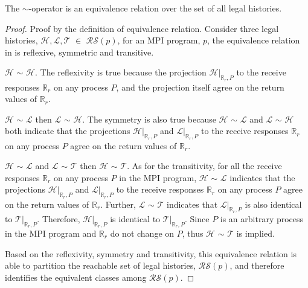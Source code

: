\begin{lemma}\label{lemma:rst}
The $\sim$-operator is an equivalence relation over the set of all legal histories.
\end{lemma}

\begin{proof}
Proof by the definition of equivalence relation. Consider three legal histories, $\mathcal{H}, \mathcal{L}, \mathcal{T}$ $\in$ $\mathcal{RS}(\mathit{p})$, for an MPI program, $\mathit{p}$, the equivalence relation in  is reflexive, symmetric and transitive.
\begin{compactenum}
\item $\mathcal{H}$ $\sim$ $\mathcal{H}$. The reflexivity is true because the projection $\mathcal{H} | _{\mathbb{R}_r,P}$ to the receive responses $\mathbb{R}_r$ on any process $P$, and the projection itself agree on the return values of $\mathbb{R}_r$.
\item $\mathcal{H}$ $\sim$ $\mathcal{L}$ then $\mathcal{L}$ $\sim$ $\mathcal{H}$. The symmetry is also true because $\mathcal{H}$ $\sim$ $\mathcal{L}$ and $\mathcal{L}$ $\sim$ $\mathcal{H}$ both indicate that the projections $\mathcal{H} | _{\mathbb{R}_r,P}$ and $\mathcal{L} | _{\mathbb{R}_r,P}$ to the receive responses $\mathbb{R}_r$ on any process $P$ agree on the return values of $\mathbb{R}_r$.
\item $\mathcal{H}$ $\sim$ $\mathcal{L}$ and $\mathcal{L}$ $\sim$ $\mathcal{T}$ then $\mathcal{H}$ $\sim$ $\mathcal{T}$. As for the transitivity, for all the receive responses $\mathbb{R}_r$ on any process $P$ in the MPI program, $\mathcal{H}$ $\sim$ $\mathcal{L}$ indicates that the projections $\mathcal{H} | _{\mathbb{R}_r,P}$ and $\mathcal{L} | _{\mathbb{R}_r,P}$ to the receive responses $\mathbb{R}_r$ on any process $P$ agree on the return values of $\mathbb{R}_r$. Further, $\mathcal{L}$ $\sim$ $\mathcal{T}$ indicates that $\mathcal{L} | _{\mathbb{R}_r,P}$ is also identical to $\mathcal{T} | _{\mathbb{R}_r,P}$. Therefore, $\mathcal{H} | _{\mathbb{R}_r,P}$ is identical to $\mathcal{T} | _{\mathbb{R}_r,P}$. Since $P$ is an arbitrary process in the MPI program and $\mathbb{R}_r$ do not change on $P$, thus $\mathcal{H}$ $\sim$ $\mathcal{T}$ is implied.
\end{compactenum}
Based on the reflexivity, symmetry and transitivity, this equivalence relation is able to partition the reachable set of legal histories, $\mathcal{RS}(\mathit{p})$, and therefore identifies the equivalent classes among $\mathcal{RS}(\mathit{p})$.
\end{proof}

